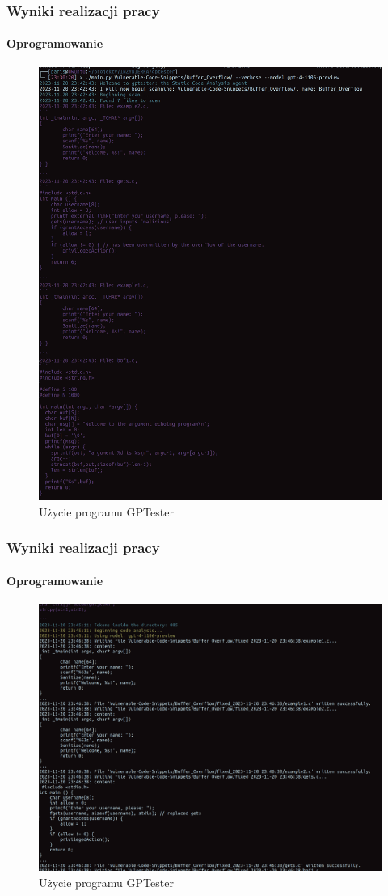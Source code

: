 \documentclass[lualatex,aspectratio=54,12pt,]{beamer}
\begin{document}
\begin{frame}
      \frametitle{Wyniki realizacji pracy}
      \framesubtitle{Oprogramowanie}
      \begin{figure}
            \centering
            \includegraphics[width=0.6
            \linewidth]{gptester1.png}
            \caption{Użycie programu GPTester}
      \end{figure}

\end{frame}

\begin{frame}
      \frametitle{Wyniki realizacji pracy}
      \framesubtitle{Oprogramowanie}
      \begin{figure}
            \centering
            \includegraphics[width=0.6
            \linewidth]{gptester2.png}
            \caption{Użycie programu GPTester}
      \end{figure}

\end{frame}
\end{document}
